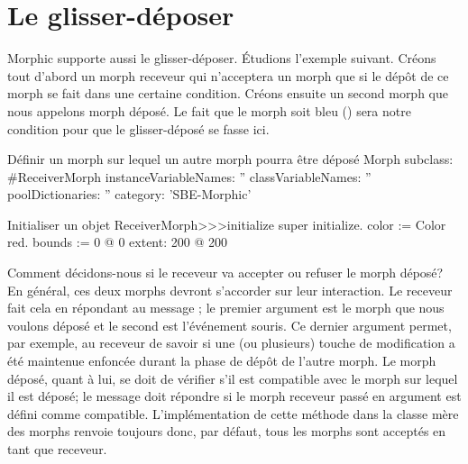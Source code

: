 \documentclass[a4paper,10pt,twoside]{book}
\begin{document}

\section{Le glisser-d\'eposer}

Morphic supporte aussi le glisser-d\'eposer. \'Etudions l'exemple
suivant. Cr\'eons tout d'abord un morph receveur qui n'acceptera un
morph que si le d\'ep\^ot de ce morph se fait dans une certaine
condition. Cr\'eons ensuite un second morph que nous appelons morph
d\'epos\'e. Le fait que le morph soit bleu () sera
notre condition pour que le glisser-d\'epos\'e se fasse ici.

\begin{classdef}{D\'efinir un morph sur lequel un autre morph pourra \^etre d\'epos\'e}
Morph subclass: #ReceiverMorph
	instanceVariableNames: ''
	classVariableNames: ''
	poolDictionaries: ''
	category: 'SBE-Morphic'
\end{classdef}

\begin{method}{Initialiser un objet }
ReceiverMorph>>>initialize
	super initialize.
	color := Color red.
	bounds := 0 @ 0 extent: 200 @ 200
\end{method}

Comment d\'ecidons-nous si le receveur va accepter ou refuser le morph
d\'epos\'e? En g\'en\'eral, ces deux morphs devront s'accorder sur
leur interaction. Le receveur fait cela en r\'epondant au message
 ; le premier argument est le
 morph que nous voulons d\'epos\'e et le second est l'\'ev\'enement
 souris. Ce dernier argument permet, par exemple, au receveur de
 savoir si une (ou plusieurs) touche de modification a \'et\'e
 maintenue enfonc\'ee durant la phase de d\'ep\^ot de l'autre morph.
Le morph d\'epos\'e, quant \`a lui, se doit de v\'erifier s'il est
compatible avec le morph sur lequel il est d\'epos\'e; le message
 doit r\'epondre  si le morph
receveur 
pass\'e en argument est d\'efini comme compatible. L'impl\'ementation
de cette m\'ethode dans la classe m\`ere des morphs  renvoie
toujours  
donc, par d\'efaut, tous les morphs sont accept\'es en tant que
receveur.
\end{document}
